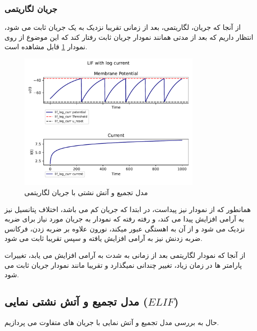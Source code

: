 \documentclass{article}
\begin{document}
            \subsubsection{جریان لگاریتمی}
                از آنجا که جریان، لگاریتمی، بعد از زمانی تقریبا نزدیک به یک جریان ثابت می شود، انتظار داریم که بعد از مدتی همانند نمودار جریان ثابت رفتار کند که این موضوع از روی نمودار 
                \ref{fig:lif-log-curr}
                قابل مشاهده است.
                \begin{figure}[H]
                    \centering
                    \includegraphics[width=0.8\textwidth]{plots/LIF with log current.pdf} 
                    \caption{مدل تجمیع و آتش نشتی با جریان لگاریتمی}
                    \label{fig:lif-log-curr}
                \end{figure}
                همانطور که از نمودار نیز پیداست، در ابتدا که جریان کم می باشد، اختلاف پتانسیل نیز به آرامی افزایش پیدا می کند، و رفته رفته که نمودار به جریان مورد نیاز برای ضربه نزدیک می شود و از آن به اهستگی عبور میکند، نورون علاوه بر ضربه زدن، فرکانس ضربه زدنش نیز به آرامی افزایش یافته و سپس تقریبا ثابت می شود.

                از آنجا که نمودار لگاریتمی بعد از زمانی به شدت به آرامی افزایش می یابد، تغییرات پارامتر ها در زمان زیاد، تغییر چندانی نمیگذارد و تقریبا مانند نمودار جریان ثابت می شود.

        \subsection{مدل تجمیع و آتش نشتی نمایی ($ELIF$)}
            حال به بررسی مدل تجمیع و آتش نمایی با جریان های متفاوت می پردازیم.
\end{document}

